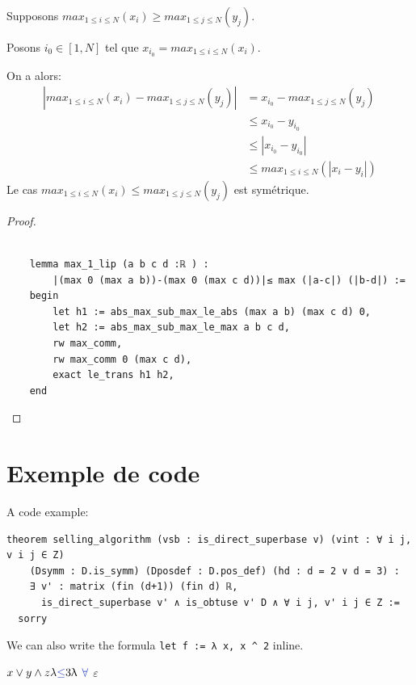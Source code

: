 \documentclass[12pt]{article}
\numberwithin{equation}{section}
\begin{document}
Supposons $max_{1\le i\le N}(x_i) \ge max_{1\le j\le N}(y_j)$.

Posons $i_0\in [1,N]$ tel que $x_{i_0}=max_{1\le i\le N}(x_i)$.

On a alors:
\begin{equation}
\begin{split}
    |max_{1\le i\le N}(x_i)-max_{1\le j\le N}(y_j)| & = x_{i_0}-max_{1\le j\le N}(y_j) \\
    & \le x_{i_0}- y_{i_0}\\
    & \le |x_{i_0}- y_{i_0}|\\
    & \le max_{1\le i\le N}(|x_i-y_i|)
\end{split}
\end{equation}
Le cas $max_{1\le i\le N}(x_i) \le max_{1\le j\le N}(y_j)$ est symétrique.

\begin{proof}
\begin{lstlisting}[gobble=2]

    lemma max_1_lip (a b c d :ℝ ) :
        |(max 0 (max a b))-(max 0 (max c d))|≤ max (|a-c|) (|b-d|) :=
    begin
        let h1 := abs_max_sub_max_le_abs (max a b) (max c d) 0,
        let h2 := abs_max_sub_max_le_max a b c d,
        rw max_comm,
        rw max_comm 0 (max c d),
        exact le_trans h1 h2,
    end
\end{lstlisting}
\end{proof}

\section*{Exemple de code}

A code example:
\begin{lstlisting}[gobble=2]
  theorem selling_algorithm (vsb : is_direct_superbase v) (vint : ∀ i j, v i j ∈ Z)
    (Dsymm : D.is_symm) (Dposdef : D.pos_def) (hd : d = 2 ∨ d = 3) :
    ∃ v' : matrix (fin (d+1)) (fin d) ℝ,
      is_direct_superbase v' ∧ is_obtuse v' D ∧ ∀ i j, v' i j ∈ Z :=
  sorry
\end{lstlisting}
We can also write the formula \lstinline{let f := λ x, x ^ 2} inline.

$ x \vee y \wedge z \lambda {\color{symbolcolor}\ensuremath{\leq}} 3\uplambda$
${\color{symbolcolor}\ensuremath{\forall}}$
$ε$
\end{document}
